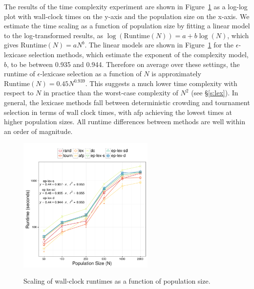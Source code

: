 \documentclass[twoside]{article}
\begin{document}
The results of the time complexity experiment are shown in Figure~\ref{fig:time_pop} as a log-log plot with wall-clock times on the y-axis and the population size on the x-axis. We estimate the time scaling as a function of population size by fitting a linear model to the log-transformed results, as $\log(\text{Runtime}(N)) = a + b \log(N)$, which gives $\text{Runtime}(N) = a N^b$. The linear models are shown in Figure~\ref{fig:time_pop} for the $\epsilon$-lexicase selection methods, which estimate the exponent of the complexity model, $b$, to be between 0.935 and 0.944. Therefore on average over these settings, the runtime of $\epsilon$-lexicase selection as a function of $N$ is approximately $\text{Runtime}(N) = 0.45 N^{0.939}$. This suggests a much lower time complexity with respect to $N$ in practice than the worst-case complexity of $N^2$ (see \S\ref{s:lex}). In general, the lexicase methods fall between deterministic crowding and tournament selection in terms of wall clock times, with afp achieving the lowest times at higher population sizes. All runtime differences between methods are well within an order of magnitude. 

\begin{figure}[htb]
\centering
  \includegraphics[width=0.6\textwidth]{figs/regression_popsize_scaling.pdf}\\
 \caption{Scaling of wall-clock runtimes as a function of population size.}\label{fig:time_pop}


\end{figure}
\end{document}
